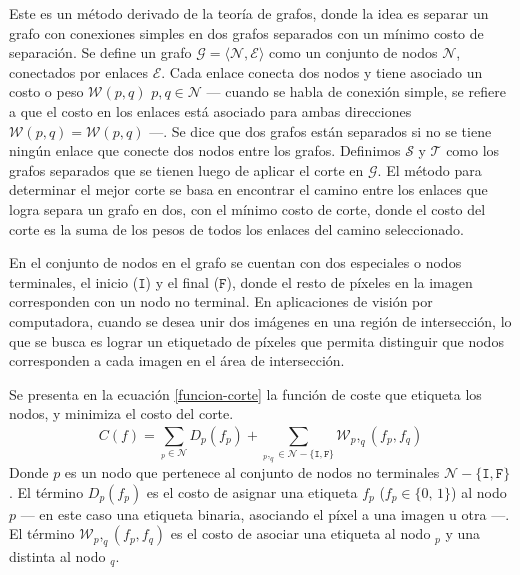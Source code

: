 Este es un método derivado de la teoría de grafos, donde la idea es separar un grafo con conexiones simples en dos grafos separados con un mínimo costo de separación. Se define un grafo $\mathcal{G} = \langle \mathcal{N}, \mathcal{E} \rangle$ como un conjunto de nodos $\mathcal{N}$, conectados por enlaces $\mathcal{E}$. Cada enlace conecta dos nodos y tiene asociado un costo o peso $\mathcal{W}(p, q) \,\, p,q \in \mathcal{N}$ --- cuando se habla de conexión simple, se refiere a que el costo en los enlaces está asociado para ambas direcciones $\mathcal{W}(p, q) = \mathcal{W}(p, q)$ ---. Se dice que dos grafos están separados si no se tiene ningún enlace que conecte dos nodos entre los grafos. Definimos $\mathcal{S}$ y $\mathcal{T}$ como los grafos separados que se tienen luego de aplicar el corte en $\mathcal{G}$. El método para determinar el mejor corte se basa en encontrar el camino entre los enlaces que logra separa un grafo en dos, con el mínimo costo de corte, donde el costo del corte es la suma de los pesos de todos los enlaces del camino seleccionado.

En el conjunto de nodos en el grafo se cuentan con dos especiales o nodos terminales, el inicio ($\mathtt{I}$) y el final ($\mathtt{F}$), donde el resto de píxeles en la imagen corresponden con un nodo no terminal. En aplicaciones de visión por computadora, cuando se desea unir dos imágenes en una región de intersección, lo que se busca es lograr un etiquetado de píxeles que permita distinguir que nodos corresponden a cada imagen en el área de intersección.

Se presenta en la ecuación \ref{funcion-corte} la función de coste que etiqueta los nodos, y minimiza el costo del corte.
\begin{equation}
C(f) = \sum_{_p\in \mathcal{N}}^{} D_p(f_p) + \sum_{_p,_q \in \mathcal{N} - \{\mathtt{I},\mathtt{F}\}}^{} \mathcal{W}_p,_q (f_p, f_q)
\label{funcion-corte}
\end{equation}
Donde $p$ es un nodo que pertenece al conjunto de nodos no terminales $\mathcal{N} - \{\mathtt{I},\mathtt{F}\}$. El término $D_p(f_p)$ es el costo de asignar una etiqueta $f_p$ ($f_p \in \{0,\,1\}$) al nodo $p$ --- en este caso una etiqueta binaria, asociando el píxel a una imagen u otra ---. El término $\mathcal{W}_p,_q (f_p, f_q)$ es el costo de asociar una etiqueta al nodo $_p$ y una distinta al nodo $_q$.

